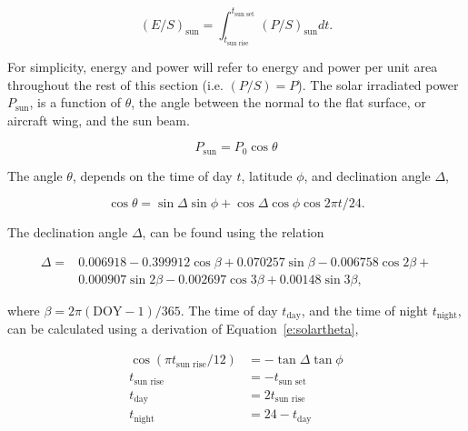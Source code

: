     \begin{equation}
        \label{e:solares}
        (E/S)_{\text{sun}} = \int_{t_{\text{sun rise}}}^{t_{\text{sun set}}} (P/S)_{\text{sun}} dt.
    \end{equation}
    
For simplicity, energy and power will refer to energy and power per unit area throughout the rest of this section (i.e. $(P/S) = P$). 
The solar irradiated power $P_{\text{sun}}$, is a function of $\theta$, the angle between the normal to the flat surface, or aircraft wing, and the sun beam.\cite{solar}

\begin{equation}
    \label{e:solarp}
    P_{\text{sun}} = P_0 \cos{\theta}
\end{equation}

The angle $\theta$, depends on the time of day $t$, latitude $\phi$, and declination angle $\Delta$,\cite{solar}

    \begin{equation}
        \label{e:solartheta}
        \cos{\theta} = \sin{\Delta} \sin{\phi} + \cos{\Delta} \cos{\phi} \cos{2\pi t/24}.
    \end{equation}

 The declination angle $\Delta$, can be found using the relation\cite{solar} 

    \begin{align}
        \label{e:solardelta}
        \Delta = &0.006918 - 0.399912 \cos{\beta} + 0.070257\sin{\beta} - 0.006758\cos{2\beta} + \nonumber \\
        & 0.000907\sin{2\beta} - 0.002697\cos{3\beta} + 0.00148\sin{3\beta},
    \end{align}

    where $\beta = 2\pi (\text{DOY}-1)/365$.
    The time of day $t_{\text{day}}$, and the time of night $t_{\text{night}}$, can be calculated using a derivation of Equation~\eqref{e:solartheta}, \cite{solar}

    \begin{align}
        \label{e:solartday}
        \cos{(\pi t_{\text{sun rise}}/12)} &= -\tan{\Delta} \tan{\phi} \\
        \label{e:solarsunrise}
        t_{\text{sun rise}} &= -t_{\text{sun set}} \\
        \label{e:solartday2}
        t_{\text{day}} &= 2t_{\text{sun rise}} \\
        \label{e:solartnight}
        t_{\text{night}} &= 24 - t_{\text{day}}
    \end{align}

